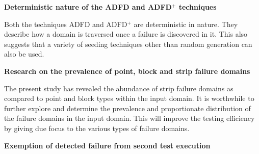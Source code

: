 \textbf{Deterministic nature of the ADFD and ADFD$^+$ techniques}

Both the techniques ADFD and ADFD$^+$ are deterministic in nature. They describe how a domain is traversed once a failure is discovered in it. This also suggests that a variety of seeding techniques other than random generation can also be used.


\textbf{Research on the prevalence of point, block and strip failure domains}

The present study has revealed the abundance of strip failure domains as compared to point and block types within the input domain. It is worthwhile to further explore and determine the prevalence and proportionate distribution of the failure domains in the input domain. This will improve the testing efficiency by giving due focus to the various types of failure domains.



\textbf{Exemption of detected failure from second test execution}



